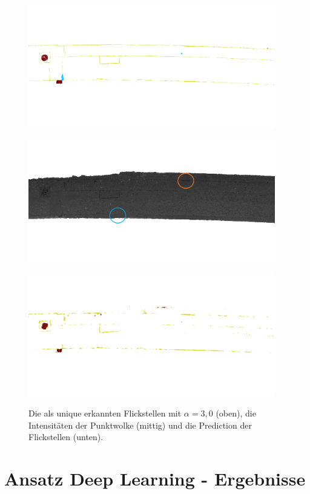 \begin{figure}
    {\includegraphics[width=0.96\textwidth]{graphics/eval_left_high_unique}}
    \par\smallskip
    {\includegraphics[width=0.96\textwidth]{graphics/eval_left_no_classes_circles}}
    \par\smallskip
    {\includegraphics[width=0.96\textwidth]{graphics/eval_left_prediction}}
    \caption{Die als unique erkannten Flickstellen mit $\alpha = 3,0$ (oben), die Intensitäten der Punktwolke (mittig) und die Prediction der Flickstellen (unten).}
    \label{fig:cmp_uniqueness}
\end{figure}

\section{Ansatz Deep Learning - Ergebnisse}

